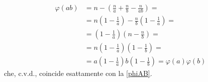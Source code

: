 \begin{equation}
\begin{split}
\varphi(ab) & = n-\left(\frac{n}{a}+\frac{n}{b}-\frac{n}{ab}\right)= \\
& = n\left(1-\frac{1}{a}\right)-\frac{n}{b}\left(1-\frac{1}{a}\right)=\\
& = \left(1-\frac{1}{a}\right)\left(n-\frac{n}{b}\right)=\\
& = n\left(1-\frac{1}{a}\right)\left(1-\frac{1}{b}\right)=\\
& = a\left(1-\frac{1}{a}\right)b\left(1-\frac{1}{b}\right)=\varphi(a)\varphi(b)
\end{split}
\end{equation}
che, c.v.d., coincide esattamente con la \eqref{phiAB}.